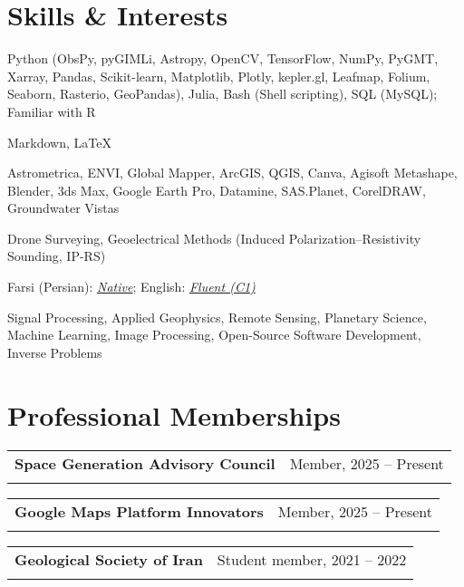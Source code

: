 \documentclass[letterpaper,11pt]{article}
\makeatletter
\newcommand{\ressubheading}[4]{%
	\begin{tabular*}{\textwidth}{l@{\cftdotfill{\cftsecdotsep}\extracolsep{\fill}}r}
		\textbf{#1} & #2 \\
		\textit{#3} & \textit{#4} \\
	\end{tabular*}\vspace{-8pt}
}
\makeatother
\begin{document}
	\section{Skills \& Interests}
							\vspace{-0.7em}
	\begin{description}[itemsep=0pt]
		
		\item[Programming Languages:] 
		Python (ObsPy, pyGIMLi, Astropy, OpenCV, TensorFlow, NumPy, PyGMT, Xarray, Pandas, Scikit-learn, Matplotlib, Plotly, kepler.gl, Leafmap, Folium, Seaborn, Rasterio, GeoPandas), Julia, Bash (Shell scripting), SQL (MySQL); Familiar with R
		
		\item[Markup Languages:] 
		Markdown, \LaTeX
		
		\item[Softwares:] 
		Astrometrica, ENVI, Global Mapper, ArcGIS, QGIS, Canva, Agisoft Metashape, Blender, 3ds Max, Google Earth Pro, Datamine, SAS.Planet, CorelDRAW, Groundwater Vistas
		
		\item[Field Techniques:] 
		Drone Surveying, Geoelectrical Methods (Induced Polarization–Resistivity Sounding, IP-RS)
		
		\item[Languages:] 
		Farsi (Persian): \textit{\underline{Native}}; English: \textit{\underline{Fluent (C1)}}
		
		\item[Research Interests:] 
		Signal Processing, Applied Geophysics, Remote Sensing, Planetary Science, Machine Learning, Image Processing, Open-Source Software Development, Inverse Problems
		
	\end{description}
	\vspace{-2.3em} 
	\section{Professional Memberships}
							\vspace{-0.2em}
\vspace{-0.5em} 
\ressubheading{Space Generation Advisory Council}{Member, 2025 – Present}{}{}
\vspace{-0.2em} 
\vspace{-0.5em} 
\ressubheading{Google Maps Platform Innovators}{Member, 2025 – Present}{}{}
\vspace{-0.2em} 
\vspace{-0.5em} 
\ressubheading{Geological Society of Iran}{Student member, 2021 – 2022}{}{}
\vspace{2em} 

\end{document}

